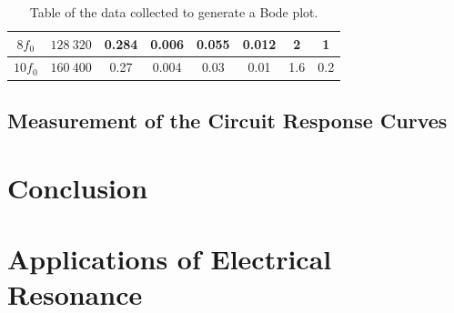 \documentclass[12pt]{article}
\begin{document}
\begin{table}[H]
{\begin{tabular}{|c|c|c|c|c|c|c|c|}
        $8 f_0$   & $128 \: 320$                                             & 0.284                                                      & 0.006                                                             & 0.055                                                      & 0.012                                                             & 2                                                                         & 1                                                                                  \\ \hline
        $10 f_0$  & $160 \: 400$                                             & 0.27                                                       & 0.004                                                             & 0.03                                                       & 0.01                                                              & 1.6                                                                       & 0.2                                                                                \\ \hline
        \end{tabular}

    }

    \caption{\centering Table of the data collected to generate a Bode plot.}
    \label{tab:1}

\end{table}

\subsection{Measurement of the Circuit Response Curves} \label{sec:3.3}



\section{Conclusion}



\section{Applications of Electrical Resonance}




\newpage







\newpage
\end{document}
